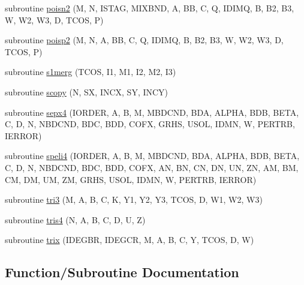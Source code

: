 \begin{DoxyCompactItemize}
\item 
subroutine \hyperlink{poisson_8f_a1a3286c2c2ed3988f551533a53fd6940}{poisn2} (M, N, I\+S\+T\+A\+G, M\+I\+X\+B\+N\+D, A, B\+B, C, Q, I\+D\+I\+M\+Q, B, B2, B3, W, W2, W3, D, T\+C\+O\+S, P)
\item 
subroutine \hyperlink{poisson_8f_aaa1fe08ecf01ed90ae4a2c1cf5be95ce}{poisp2} (M, N, A, B\+B, C, Q, I\+D\+I\+M\+Q, B, B2, B3, W, W2, W3, D, T\+C\+O\+S, P)
\item 
subroutine \hyperlink{poisson_8f_ad5fdef356b1982072c3e7c0c95b21372}{s1merg} (T\+C\+O\+S, I1, M1, I2, M2, I3)
\item 
subroutine \hyperlink{poisson_8f_a24785e467bd921df5a2b7300da57c469}{scopy} (N, S\+X, I\+N\+C\+X, S\+Y, I\+N\+C\+Y)
\item 
subroutine \hyperlink{poisson_8f_a3bae4b2dbb12aa9ef1982c25a75b4dad}{sepx4} (I\+O\+R\+D\+E\+R, A, B, M, M\+B\+D\+C\+N\+D, B\+D\+A, A\+L\+P\+H\+A, B\+D\+B, B\+E\+T\+A, C, D, N, N\+B\+D\+C\+N\+D, B\+D\+C, B\+D\+D, C\+O\+F\+X, G\+R\+H\+S, U\+S\+O\+L, I\+D\+M\+N, W, P\+E\+R\+T\+R\+B, I\+E\+R\+R\+O\+R)
\item 
subroutine \hyperlink{poisson_8f_a5dc2044995a8b7eba5b7d6e919f893e1}{speli4} (I\+O\+R\+D\+E\+R, A, B, M, M\+B\+D\+C\+N\+D, B\+D\+A, A\+L\+P\+H\+A, B\+D\+B, B\+E\+T\+A, C, D, N, N\+B\+D\+C\+N\+D, B\+D\+C, B\+D\+D, C\+O\+F\+X, A\+N, B\+N, C\+N, D\+N, U\+N, Z\+N, A\+M, B\+M, C\+M, D\+M, U\+M, Z\+M, G\+R\+H\+S, U\+S\+O\+L, I\+D\+M\+N, W, P\+E\+R\+T\+R\+B, I\+E\+R\+R\+O\+R)
\item 
subroutine \hyperlink{poisson_8f_a3734e68dfa3022162c3f94650a43d8d9}{tri3} (M, A, B, C, K, Y1, Y2, Y3, T\+C\+O\+S, D, W1, W2, W3)
\item 
subroutine \hyperlink{poisson_8f_acc6b03c725e2ea27649e45764c502fb2}{tris4} (N, A, B, C, D, U, Z)
\item 
subroutine \hyperlink{poisson_8f_a7822bc5b65c017cec3010a9f33cb316f}{trix} (I\+D\+E\+G\+B\+R, I\+D\+E\+G\+C\+R, M, A, B, C, Y, T\+C\+O\+S, D, W)
\end{DoxyCompactItemize}


\subsection{Function/\+Subroutine Documentation}
\hypertarget{poisson_8f_a82f42c45b2e6677f11e94429b26e1663}{}
